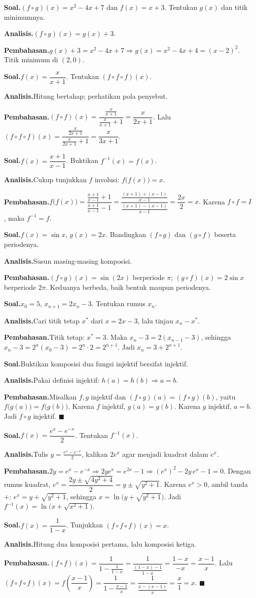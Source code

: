 \documentclass[11pt,a4paper]{report}
\theoremstyle{gaya}
\newcommand{\knomor}[1]{\par\medskip\noindent{\bfseries\color{ungu}#1}\par\nopagebreak}
\newcommand{\ksoal}{\noindent\textbf{\color{biru}Soal.}\space}
\newcommand{\kanalisis}{\par\noindent\textbf{\color{oranye}Analisis.}\space}
\newcommand{\kbahas}{\par\noindent\textbf{\color{hijau}Pembahasan.}\space}
\newcommand{\kbagian}[1]{\par\medskip\noindent{\large\bfseries\color{biru}#1}\par\smallskip}
\begin{document}
\knomor{C.3}
\ksoal $(f\circ g)(x)=x^2-4x+7$ dan $f(x)=x+3$. Tentukan $g(x)$ dan titik minimumnya.
\kanalisis $(f\circ g)(x)=g(x)+3$.
\kbahas $g(x)+3=x^2-4x+7\Rightarrow g(x)=x^2-4x+4=(x-2)^2$. Titik minimum di $(2,0)$.

\knomor{C.4}
\ksoal $f(x)=\dfrac{x}{x+1}$. Tentukan $(f\circ f\circ f)(x)$.
\kanalisis Hitung bertahap; perhatikan pola penyebut.
\kbahas $(f\circ f)(x)=\dfrac{\frac{x}{x+1}}{\frac{x}{x+1}+1}=\dfrac{x}{2x+1}$. Lalu $(f\circ f\circ f)(x)=\dfrac{\frac{x}{2x+1}}{\frac{x}{2x+1}+1}=\dfrac{x}{3x+1}.$

\knomor{C.5}
\ksoal $f(x)=\dfrac{x+1}{x-1}$. Buktikan $f^{-1}(x)=f(x)$.
\kanalisis Cukup tunjukkan $f$ involusi: $f\big(f(x)\big)=x$.
\kbahas $f\big(f(x)\big)=\dfrac{\frac{x+1}{x-1}+1}{\frac{x+1}{x-1}-1}=\dfrac{\frac{(x+1)+(x-1)}{x-1}}{\frac{(x+1)-(x-1)}{x-1}}=\dfrac{2x}{2}=x.$ Karena $f\circ f=I$, maka $f^{-1}=f$.

\knomor{C.6}
\ksoal $f(x)=\sin x$, $g(x)=2x$. Bandingkan $(f\circ g)$ dan $(g\circ f)$ beserta periodenya.
\kanalisis Susun masing-masing komposisi.
\kbahas $(f\circ g)(x)=\sin(2x)$ berperiode $\pi$; \quad $(g\circ f)(x)=2\sin x$ berperiode $2\pi$. Keduanya berbeda, baik bentuk maupun periodenya.

\knomor{C.7}
\ksoal $x_0=5$, $x_{n+1}=2x_n-3$. Tentukan rumus $x_n$.
\kanalisis Cari titik tetap $x^*$ dari $x=2x-3$, lalu tinjau $x_n-x^*$.
\kbahas Titik tetap: $x^*=3$. Maka $x_{n}-3=2(x_{n-1}-3)$, sehingga $x_n-3=2^{n}(x_0-3)=2^{n}\cdot2=2^{n+1}$. Jadi $x_n=3+2^{n+1}.$

\kbagian{Bagian D}

\knomor{D.1}
\ksoal Buktikan komposisi dua fungsi injektif bersifat injektif.
\kanalisis Pakai definisi injektif: $h(a)=h(b)\Rightarrow a=b$.
\kbahas Misalkan $f,g$ injektif dan $(f\circ g)(a)=(f\circ g)(b)$, yaitu $f\big(g(a)\big)=f\big(g(b)\big)$. Karena $f$ injektif, $g(a)=g(b)$. Karena $g$ injektif, $a=b$. Jadi $f\circ g$ injektif. $\blacksquare$

\knomor{D.2}
\ksoal $f(x)=\dfrac{e^{x}-e^{-x}}{2}$. Tentukan $f^{-1}(x)$.
\kanalisis Tulis $y=\tfrac{e^x-e^{-x}}{2}$, kalikan $2e^x$ agar menjadi kuadrat dalam $e^x$.
\kbahas $2y=e^x-e^{-x}\Rightarrow 2ye^x=e^{2x}-1\Rightarrow (e^x)^2-2y\,e^x-1=0$. Dengan rumus kuadrat, $e^x=\dfrac{2y\pm\sqrt{4y^2+4}}{2}=y\pm\sqrt{y^2+1}$. Karena $e^x>0$, ambil tanda $+$: $e^x=y+\sqrt{y^2+1}$, sehingga $x=\ln\!\big(y+\sqrt{y^2+1}\big)$. Jadi $f^{-1}(x)=\ln\!\big(x+\sqrt{x^2+1}\big).$

\knomor{D.3}
\ksoal $f(x)=\dfrac{1}{1-x}$. Tunjukkan $(f\circ f\circ f)(x)=x$.
\kanalisis Hitung dua komposisi pertama, lalu komposisi ketiga.
\kbahas $(f\circ f)(x)=\dfrac{1}{1-\frac{1}{1-x}}=\dfrac{1}{\frac{(1-x)-1}{1-x}}=\dfrac{1-x}{-x}=\dfrac{x-1}{x}$. Lalu $(f\circ f\circ f)(x)=f\!\left(\dfrac{x-1}{x}\right)=\dfrac{1}{1-\frac{x-1}{x}}=\dfrac{1}{\frac{x-(x-1)}{x}}=\dfrac{x}{1}=x.$ $\blacksquare$
\end{document}
